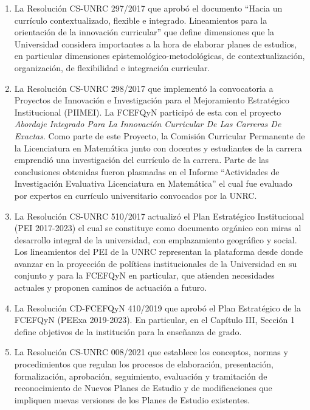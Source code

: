 \documentclass[a4paper, 12pt]{article}
\begin{document}
\begin{enumerate}
 \item La Resolución CS-UNRC 297/2017 que aprobó el documento ``Hacia   un   currículo contextualizado, flexible e integrado. Lineamientos para la orientación de la innovación  curricular'' que define dimensiones que la Universidad considera importantes a la hora de elaborar planes de estudios, en particular dimensiones epistemológico-metodológicas, de contextualización, organización, de flexibilidad e integración curricular. 

 \item La Resolución CS-UNRC 298/2017  que implementó  la convocatoria a  Proyectos de Innovación e Investigación para el Mejoramiento Estratégico Institucional (PIIMEI). La FCEFQyN  participó de esta con el proyecto \emph{Abordaje Integrado Para La Innovación Curricular De Las Carreras De
Exactas}. Como parte de este Proyecto, la Comisión Curricular Permanente de la Licenciatura en Matemática junto con docentes y estudiantes de la carrera emprendió una investigación del currículo de la carrera.  Parte de las conclusiones obtenidas fueron plasmadas  en el Informe ``Actividades de Investigación Evaluativa
Licenciatura en Matemática'' el cual fue evaluado por expertos en currículo universitario  convocados por la UNRC.

\item La Resolución CS-UNRC 510/2017  actualizó el Plan Estratégico Institucional (PEI 2017-2023) el cual se constituye como documento orgánico con miras al desarrollo integral de la universidad, con emplazamiento geográfico y social. Los lineamientos del PEI de la UNRC representan la plataforma desde donde avanzar en la proyección de políticas institucionales de la Universidad en su conjunto y para la FCEFQyN en particular, que atienden necesidades actuales y proponen caminos de actuación a futuro.

\item La Resolución CD-FCEFQyN 410/2019 que aprobó  el Plan Estratégico de la FCEFQyN (PEExa 2019-2023). En particular, en el Capítulo III, Sección 1 define objetivos de la institución para la enseñanza de grado.   

 \item La Resolución CS-UNRC 008/2021 que establece los conceptos, normas y procedimientos que regulan los procesos de elaboración, presentación, formalización, aprobación, seguimiento, evaluación y tramitación de reconocimiento de Nuevos Planes de Estudio y de modificaciones que impliquen nuevas versiones de los Planes de Estudio existentes.

\end{enumerate}
\end{document}
